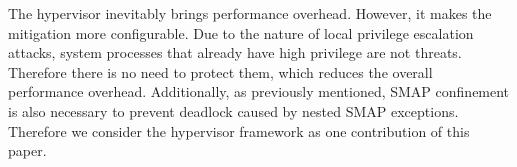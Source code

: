 The hypervisor inevitably brings performance overhead. However, it makes the mitigation more configurable. Due to the nature of local privilege escalation attacks, system processes that already have high privilege are not threats. Therefore there is no need to protect them, which reduces the overall performance overhead.  Additionally, as previously mentioned, SMAP confinement is also necessary to prevent deadlock caused by nested SMAP exceptions. Therefore we consider the hypervisor framework as one contribution of this paper.
